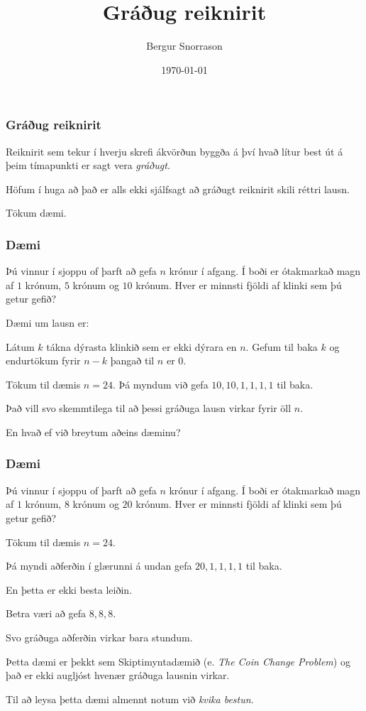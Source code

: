 \title{Gráðug reiknirit}
\author{Bergur Snorrason}
\date{\today}



\frame{\titlepage}

{
	\frametitle{Gráðug reiknirit}
	{
		\item<1-> Reiknirit sem tekur í hverju skrefi ákvörðun byggða á því hvað lítur best út á þeim tímapunkti er sagt vera \emph{gráðugt}.
		\item<2-> Höfum í huga að það er alls ekki sjálfsagt að gráðugt reiknirit skili réttri lausn.
		\item<3-> Tökum dæmi.
	}
}

{
	\frametitle{Dæmi}
	{
		\item<1-> 
			Þú vinnur í sjoppu of þarft að gefa $n$ krónur í afgang. 
			Í boði er ótakmarkað magn af $1$ krónum, $5$ krónum og $10$ krónum.
			Hver er minnsti fjöldi af klinki sem þú getur gefið?
		\item<2-> Dæmi um lausn er:
		\item<3-> Látum $k$ tákna dýrasta klinkið sem er ekki dýrara en $n$. Gefum til baka $k$ og endurtökum fyrir $n - k$ þangað til $n$ er $0$.
		\item<4-> Tökum til dæmis $n = 24$. Þá myndum við gefa $10, 10, 1, 1, 1, 1$ til baka.
		\item<5-> Það vill svo skemmtilega til að þessi gráðuga lausn virkar fyrir öll $n$.
		\item<6-> En hvað ef við breytum aðeins dæminu?
	}
}

{
	\frametitle{Dæmi}
	{
		\item<1-> 
			Þú vinnur í sjoppu of þarft að gefa $n$ krónur í afgang. 
			Í boði er ótakmarkað magn af $1$ krónum, $8$ krónum og $20$ krónum.
			Hver er minnsti fjöldi af klinki sem þú getur gefið?
		\item<2-> Tökum til dæmis $n = 24$.
		\item<3-> Þá myndi aðferðin í glærunni á undan gefa $20, 1, 1, 1, 1$ til baka.
		\item<4-> En þetta er ekki besta leiðin.
		\item<5-> Betra væri að gefa $8, 8, 8$.
		\item<6-> Svo gráðuga aðferðin virkar bara stundum.
		\item<7-> Þetta dæmi er þekkt sem Skiptimyntadæmið (e. \emph{The Coin Change Problem}) og það er ekki augljóst hvenær gráðuga lausnin virkar.
		\item<8-> Til að leysa þetta dæmi almennt notum við \emph{kvika bestun}.
	}
}

